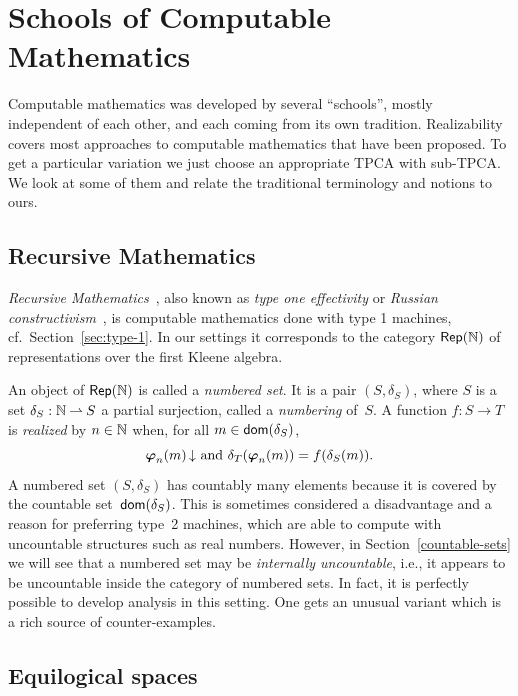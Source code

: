 \section{Schools of Computable Mathematics}
\label{sec:schools}

Computable mathematics was developed by several ``schools'', mostly
independent of each other, and each coming from its own tradition.
Realizability covers most approaches to computable mathematics that
have been proposed. To get a particular variation we just choose an
appropriate TPCA with sub-TPCA. We look at some of them and relate the
traditional terminology and notions to ours.

\subsection{Recursive Mathematics}
\label{sec:recursive-math}

\emph{Recursive Mathematics}~\cite{type-1}, also known as \emph{type
  one effectivity} or \emph{Russian constructivism}~\cite{russ}, is
computable mathematics done with type 1 machines, cf.\
Section~\ref{sec:type-1}. In our settings it corresponds to the
category $\mathsf{Rep}(\mathbb{N})$ of representations over the first Kleene algebra.

An object of $\mathsf{Rep}(\mathbb{N})$ is called a \emph{numbered set}. It is a pair
$(S, \delta_S)$, where $S$ is a set $\delta_S : \mathbb{N} \mathbin{\rightharpoonup} S$ a
partial surjection, called a \emph{numbering} of~$S$. A function $f :
S \to T$ is \emph{realized} by $n \in \mathbb{N}$ when, for all $m \in
\mathsf{dom}(\delta_S)$,
%
\begin{equation*}
  \text{$\text{\boldmath{$\varphi$}}_{n}(m)\,{\downarrow}$ and $\delta_T(\text{\boldmath{$\varphi$}}_{n}(m)) = f(\delta_S(m))$.}
\end{equation*}
%
A numbered set $(S, \delta_S)$ has countably many elements because it
is covered by the countable set~$\mathsf{dom}(\delta_S)$. This is sometimes
considered a disadvantage and a reason for preferring type~2 machines,
which are able to compute with uncountable structures such as real
numbers. However, in Section~\ref{countable-sets} we will see that a
numbered set may be \emph{internally uncountable}, i.e., it appears to
be uncountable inside the category of numbered sets. In fact, it is
perfectly possible to develop analysis in this setting. One gets an
unusual variant which is a rich source of counter-examples.

\subsection{Equilogical spaces}
\label{sec:equilogical-spaces}

